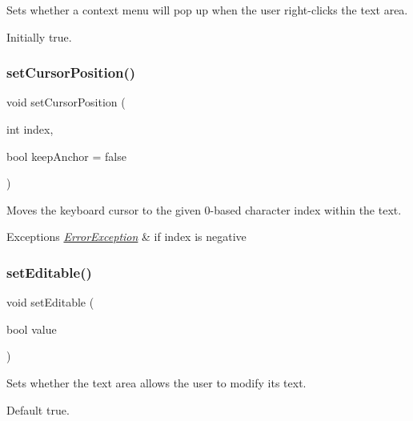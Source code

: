 Sets whether a context menu will pop up when the user right-\/clicks the text area. 

Initially true. \mbox{\label{classGTextArea_a5817e10a86be5cd41b3668d8fccb10e0}} 
\subsubsection{\texorpdfstring{set\+Cursor\+Position()}{setCursorPosition()}}
{\footnotesize\ttfamily void set\+Cursor\+Position (\begin{DoxyParamCaption}\item[{int}]{index,  }\item[{bool}]{keep\+Anchor = {\ttfamily false} }\end{DoxyParamCaption})\hspace{0.3cm}{\ttfamily [virtual]}}



Moves the keyboard cursor to the given 0-\/based character index within the text. 


\begin{DoxyExceptions}{Exceptions}
{\em \mbox{\hyperlink{classErrorException}{Error\+Exception}}} & if index is negative \\
\hline
\end{DoxyExceptions}
\mbox{\label{classGTextArea_a008d7fd44fb3e7a6886cdaddbc3644a2}} 
\subsubsection{\texorpdfstring{set\+Editable()}{setEditable()}}
{\footnotesize\ttfamily void set\+Editable (\begin{DoxyParamCaption}\item[{bool}]{value }\end{DoxyParamCaption})\hspace{0.3cm}{\ttfamily [virtual]}}



Sets whether the text area allows the user to modify its text. 

Default true. \mbox{\label{classGInteractor_ab831367dd84bbd579e02e55bacb21343}} 
